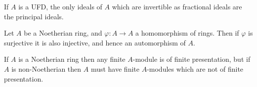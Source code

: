 \begin{exercise}\label{ex:3.5-ex}
If $A$ is a UFD, the only ideals of $A$ which are invertible as fractional ideals
are the principal ideals.
\end{exercise}

\begin{exercise}\label{ex:3.6-ex}
Let $A$ be a Noetherian ring, and $\varphi\colon A \to A$ a homomorphism of rings.
Then if $\varphi$ is surjective it is also injective, and hence an automorphism of $A$.
\end{exercise}

\begin{exercise}\label{ex:3.7-ex}
If $A$ is a Noetherian ring then any finite $A$-module is of finite presentation,
but if $A$ is non-Noetherian then $A$ must have finite $A$-modules which are
not of finite presentation.
\end{exercise}
